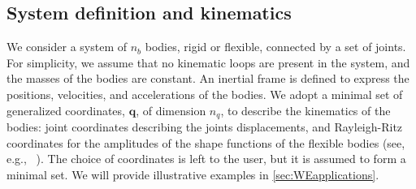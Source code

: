 \documentclass[wes, manuscript]{copernicus}
\renewcommand{\v}[1]{\boldsymbol{#1}}
\begin{document}
\subsection{System definition and kinematics}
We consider a system of $n_b$ bodies, rigid or flexible, connected by a set of joints.
For simplicity, we assume that no kinematic loops are present in the system, and the masses of the bodies are constant.
An inertial frame is defined to express the positions, velocities, and accelerations of the bodies.
We adopt a minimal set of generalized coordinates, $\v{q}$, of dimension $n_q$, to describe the kinematics of the bodies: joint coordinates describing the joints displacements, and Rayleigh-Ritz coordinates for the amplitudes of the shape functions of the flexible bodies (see, e.g., ~\cite{branlard:2019flex}).
The choice of coordinates is left to the user, but it is assumed to form a minimal set.
We will provide illustrative examples in \autoref{sec:WEapplications}.
\end{document}
